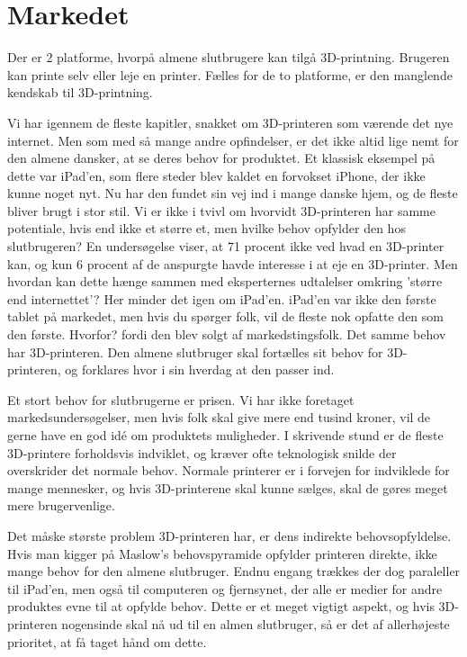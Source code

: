 \newpage
\section{Markedet} %

Der er 2 platforme, hvorpå almene slutbrugere kan tilgå 3D-printning. Brugeren kan printe selv eller leje en printer. Fælles for de to platforme, er den manglende kendskab til 3D-printning.





Vi har igennem de fleste kapitler, snakket om 3D-printeren som værende det nye internet. Men som med så mange andre opfindelser, er det ikke altid lige nemt for den almene dansker, at se deres behov for produktet. Et klassisk eksempel på dette var iPad'en, som flere steder blev kaldet en forvokset iPhone, der ikke kunne noget nyt. Nu har den fundet sin vej ind i mange danske hjem, og de fleste bliver brugt i stor stil. 
Vi er ikke i tvivl om hvorvidt 3D-printeren har samme potentiale, hvis end ikke et større et, men hvilke behov opfylder den hos slutbrugeren? En undersøgelse viser, at 71 procent ikke ved hvad en 3D-printer kan, og kun 6 procent af de anspurgte havde interesse i at eje en 3D-printer.
Men hvordan kan dette hænge sammen med eksperternes udtalelser omkring 'større end internettet'? \autocite{financial_times_3d_2012} Her minder det igen om iPad'en. iPad'en var ikke den første tablet på markedet, men hvis du spørger folk, vil de fleste nok opfatte den som den første. Hvorfor? fordi den blev solgt af markedstingsfolk. Det samme behov har 3D-printeren. Den almene slutbruger skal fortælles sit behov for 3D-printeren, og forklares hvor i sin hverdag at den passer ind.

Et stort behov for slutbrugerne er prisen. Vi har ikke foretaget markedsundersøgelser, men hvis folk skal give mere end tusind kroner, vil de gerne have en god idé om produktets muligheder. I skrivende stund er de fleste 3D-printere forholdsvis indviklet, og kræver ofte teknologisk snilde der overskrider det normale behov. Normale printerer er i forvejen for indviklede for mange mennesker, og hvis 3D-printerene skal kunne sælges, skal de gøres meget mere brugervenlige.

Det måske største problem 3D-printeren har, er dens indirekte behovsopfyldelse. Hvis man kigger på Maslow's behovspyramide \autocite{abraham_harold_maslow_theory_1943} opfylder printeren direkte, ikke mange behov for den almene slutbruger. Endnu engang trækkes der dog paraleller til iPad'en, men også til computeren og fjernsynet, der alle er medier for andre produktes evne til at opfylde behov. Dette er et meget vigtigt aspekt, og hvis 3D-printeren nogensinde skal nå ud til en almen slutbruger, så er det af allerhøjeste prioritet, at få taget hånd om dette.




